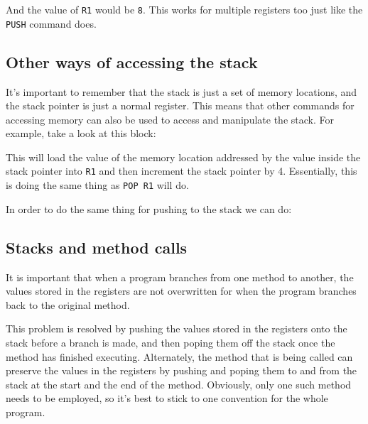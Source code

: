 And the value of {\tt R1} would be {\tt 8}. This works for multiple registers
too just like the {\tt PUSH} command does.
	

\subsection{Other ways of accessing the stack}

It's important to remember that the stack is just a set of memory locations, and
the stack pointer is just a normal register. This means that other commands for
accessing memory can also be used to access and manipulate the stack. For
example, take a look at this block:



This will load the value of the memory location addressed by the value inside
the stack pointer into {\tt R1} and then increment the stack pointer by 4.
Essentially, this is doing the same thing as {\tt POP R1} will do.

In order to do the same thing for pushing to the stack we can do:



\subsection{Stacks and method calls}

It is important that when a program branches from one method to another, the
values stored in the registers are not overwritten for when the program branches
back to the original method.


This problem is resolved by pushing the values stored in the registers onto the
stack before a branch is made, and then poping them off the stack once the
method has finished executing. Alternately, the method that is being called can
preserve the values in the registers by pushing and poping them to and from the
stack at the start and the end of the method. Obviously, only one such method
needs to be employed, so it's best to stick to one convention for the whole
program.

